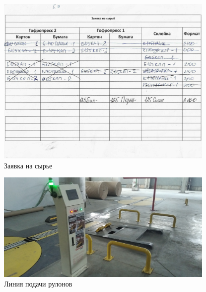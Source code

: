 \begin{figure}
\begin{center}
  \includegraphics[height=0.94\textheight, width=0.94\textwidth, keepaspectratio]{Pics 1/5.9 заявка на сырье с ГА НА СКЛАД_0001.jpg }
\end{center}
  \caption{Заявка на сырье}
  \label{pic:5.9 заявка на сырье с ГА НА СКЛАД_0001}
\end{figure}

\begin{figure}
\begin{center}
  \includegraphics[height=0.94\textheight, width=0.94\textwidth, keepaspectratio]{Pics 1/5 Подача рулонов на раскаты ГА.jpg }
\end{center}
  \caption{Линия подачи рулонов}
  \label{pic:5 Подача рулонов на раскаты ГА}
\end{figure}

